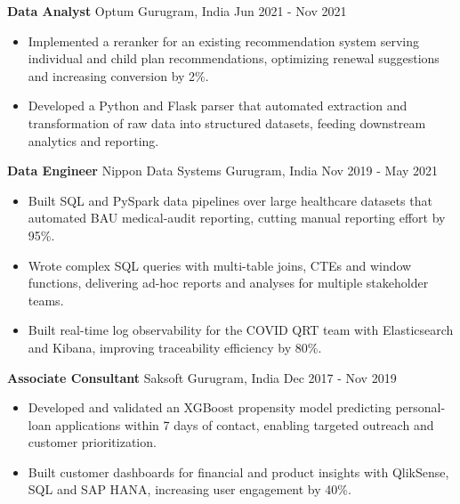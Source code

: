 \documentclass[10pt,a4paper]{article}
\newcommand{\role}[4]{\textbf{#1} \textbar{} #2 \hfill #3 \textbar{} #4\par}
\begin{document}
\vspace{3pt}
\role{Data Analyst}{Optum}{Gurugram, India}{Jun 2021 - Nov 2021}
\begin{itemize}
  \item Implemented a reranker for an existing recommendation system serving individual and child plan recommendations, optimizing renewal suggestions and increasing conversion by 2\%.
  \item Developed a Python and Flask parser that automated extraction and transformation of raw data into structured datasets, feeding downstream analytics and reporting.
\end{itemize}
\vspace{3pt}
\role{Data Engineer}{Nippon Data Systems}{Gurugram, India}{Nov 2019 - May 2021}
\begin{itemize}
  \item Built SQL and PySpark data pipelines over large healthcare datasets that automated BAU medical-audit reporting, cutting manual reporting effort by 95\%.
  \item Wrote complex SQL queries with multi-table joins, CTEs and window functions, delivering ad-hoc reports and analyses for multiple stakeholder teams.
  \item Built real-time log observability for the COVID QRT team with Elasticsearch and Kibana, improving traceability efficiency by 80\%.
\end{itemize}
\vspace{3pt}
\role{Associate Consultant}{Saksoft}{Gurugram, India}{Dec 2017 - Nov 2019}
\begin{itemize}
  \item Developed and validated an XGBoost propensity model predicting personal-loan applications within 7 days of contact, enabling targeted outreach and customer prioritization.
  \item Built customer dashboards for financial and product insights with QlikSense, SQL and SAP HANA, increasing user engagement by 40\%.
\end{itemize}
\end{document}

